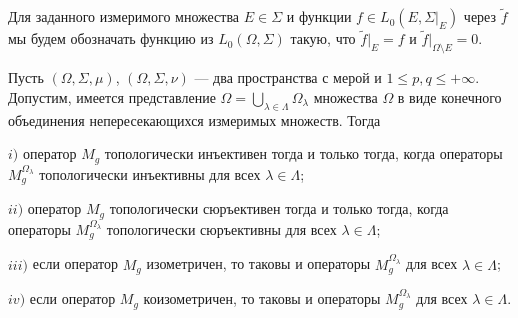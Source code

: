 Для заданного измеримого множества $E\in\Sigma$ и функции $f\in L_0(E,\Sigma|_{E})$ через $\widetilde{f}$ мы будем обозначать функцию из $L_0(\Omega, \Sigma)$ такую, что $\widetilde{f}|_E=f$ и $\widetilde{f}|_{\Omega\setminus E}=0$.

\begin{proposition}\label{MultOpDecompDecomp} Пусть $(\Omega,\Sigma,\mu)$, $(\Omega,\Sigma,\nu)$ --- два пространства с мерой и $1\leq p,q\leq +\infty$. Допустим, имеется представление $\Omega=\bigcup_{\lambda\in\Lambda}\Omega_\lambda$ множества $\Omega$ в виде конечного объединения непересекающихся измеримых множеств. Тогда 

$i)$ оператор $M_g$ топологически инъективен тогда и только тогда, когда операторы $M_g^{\Omega_\lambda}$ топологически инъективны для всех $\lambda\in\Lambda$;

$ii)$ оператор $M_g$ топологически сюръективен тогда и только тогда, когда операторы $M_g^{\Omega_\lambda}$ топологически сюръективны для всех $\lambda\in\Lambda$;

$iii)$ если оператор $M_g$ изометричен, то таковы и операторы $M_g^{\Omega_\lambda}$ для всех $\lambda\in\Lambda$;

$iv)$ если оператор $M_g$ коизометричен, то таковы и операторы $M_g^{\Omega_\lambda}$ для всех $\lambda\in\Lambda$.
\end{proposition}
